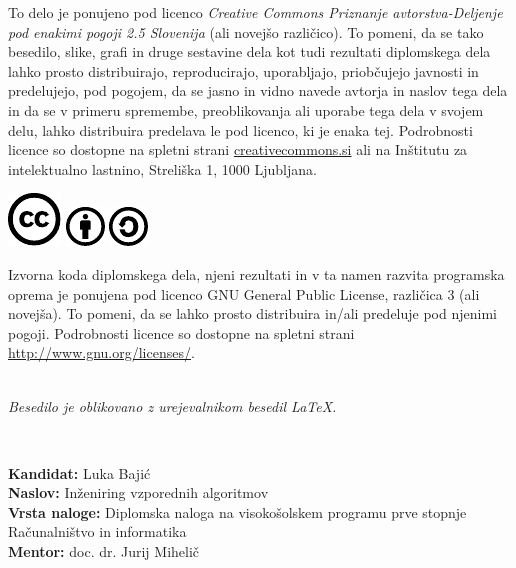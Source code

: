 \documentclass[a4paper,12pt,openright]{book}
\newcommand{\clearemptydoublepage}{\newpage{\pagestyle{empty}\cleardoublepage}}
\newcommand{\CcImageCc}[1]{%
	\includegraphics[scale=#1]{cc_cc_30.pdf}%
}
\newcommand{\CcImageBy}[1]{%
	\includegraphics[scale=#1]{cc_by_30.pdf}%
}
\newcommand{\CcImageSa}[1]{%
	\includegraphics[scale=#1]{cc_sa_30.pdf}%
}
\begin{document}
\newpage
\thispagestyle{empty}

\vspace*{5cm}
{\small \noindent
To delo je ponujeno pod licenco \textit{Creative Commons Priznanje avtorstva-Deljenje pod enakimi pogoji 2.5 Slovenija} (ali novej\v so razli\v cico).
To pomeni, da se tako besedilo, slike, grafi in druge sestavine dela kot tudi rezultati diplomskega dela lahko prosto distribuirajo,
reproducirajo, uporabljajo, priobčujejo javnosti in predelujejo, pod pogojem, da se jasno in vidno navede avtorja in naslov tega
dela in da se v primeru spremembe, preoblikovanja ali uporabe tega dela v svojem delu, lahko distribuira predelava le pod
licenco, ki je enaka tej.
Podrobnosti licence so dostopne na spletni strani \href{http://creativecommons.si}{creativecommons.si} ali na Inštitutu za
intelektualno lastnino, Streliška 1, 1000 Ljubljana.

\vspace*{1cm}
\begin{center}%
\CcImageCc{0.741573033707865}\hspace*{1ex}\CcImageBy{1}\hspace*{1ex}\CcImageSa{1}%
\end{center}
}

\vspace*{1cm}
{\small \noindent
Izvorna koda diplomskega dela, njeni rezultati in v ta namen razvita programska oprema je ponujena pod licenco GNU General Public License,
različica 3 (ali novejša). To pomeni, da se lahko prosto distribuira in/ali predeluje pod njenimi pogoji.
Podrobnosti licence so dostopne na spletni strani \url{http://www.gnu.org/licenses/}.
}

\vfill
\begin{center} 
\ \\ \vfill
{\em
Besedilo je oblikovano z urejevalnikom besedil \LaTeX.}
\end{center}

\clearemptydoublepage

\thispagestyle{empty}
\
\vfill

\bigskip
\noindent\textbf{Kandidat:} Luka Bajić\\
\noindent\textbf{Naslov:} Inženiring vzporednih algoritmov\\
\noindent\textbf{Vrsta naloge:} Diplomska naloga na visokošolskem programu prve stopnje Računalništvo in informatika \\
\noindent\textbf{Mentor:} doc. dr. Jurij Mihelič\\
\end{document}
